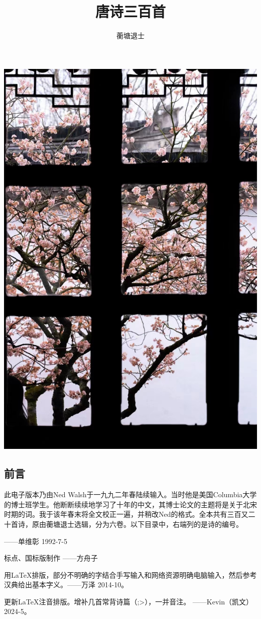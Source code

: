 \documentclass[12pt,oneside,a5paper]{book}
\begin{document}
\frontmatter

\title{唐诗三百首}
\author{蘅塘退士}
\maketitle

\begin{center}
    \includegraphics[width=.5\textwidth,height=.5\textheight,keepaspectratio]{题照拙句.jpg}
\end{center}

\begin{common-format}
\chapter*{前言}

此电子版本乃由Ned Walsh于一九九二年春陆续输入。当时他是美国Columbia大学的博士班学生。他断断续续地学习了十年的中文，其博士论文的主题将是关于北宋时期的词。我于该年春末将全文校正一遍，并稍改Ned的格式。全本共有三百又二十首诗，原由蘅塘退士选辑，分为六卷。以下目录中，右端列的是诗的编号。

——单维彰 1992-7-5

标点、国标版制作 ——方舟子

用\LaTeX 排版，部分不明确的字结合手写输入和网络资源明确电脑输入，然后参考汉典给出基本字义。——万泽 2014-10。

更新\LaTeX 注音排版。增补几首常背诗篇（;>），一并音注。 ——Kevin（凯文） 2024-5。


\end{common-format}
\end{document}
